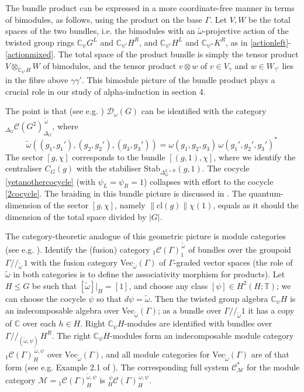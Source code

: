 \documentclass[12pt]{article}
\numberwithin{equation}{section}
\def\cC            {{\mathcal{C}}}
\def\cD            {{\mathcal{D}}}
\def\cM            {{\mathcal{M}}}
\def\bbC           {\mathbb{C}}
\def\bbT           {\mathbb{T}}
\begin{document}
The bundle product can be expressed in a more coordinate-free manner in terms of bimodules, as follows, using the product on the base $\Gamma$. Let $V,W$ be the
total spaces of the two bundles, i.e. the bimodules with an $\widetilde{\omega}$-projective action of the twisted group rings
$\bbC_{\psi}G^L$ and $\bbC_{\psi'}H^R$, and $\bbC_{\psi'}H^L$ and $\bbC_{\psi''}K^R$, as in \eqref{actionleft}-\eqref{actionmixed}. The total space
of the product bundle is simply the tensor product $V\otimes_{\bbC_{\psi'}H}W$ of bimodules, and the tensor product $v\otimes w$ of $v\in V_\gamma$ and $w\in W_{\gamma'}$ lies in the fibre above $\gamma\gamma'$. This bimodule picture of the bundle product  plays a crucial role in our study of 
alpha-induction in section 4.



The point is that (see e.g. \cite{Ost,Ev}) $\cD_\omega(G)$ can be identified with the category  ${}_{\Delta_G}\cC(G^2)_{\Delta_G}^{\,\tilde{\omega}}$, where 
\begin{equation}\widetilde{\omega}((g_1,g_1'),(g_2,g_2'),(g_3,g_3'))=\omega(g_1,g_2,g_3)\,\omega(g_1',g_2',g_3')^*\,\label{tildeomega}\end{equation}
{The sector $[g,\chi]$  corresponds to the bundle $[(g,1),\chi]$,}
where we identify the centraliser $C_G(g)$ with the stabiliser Stab$_{\Delta_G^{L\times R}}(g,1)$. The cocycle \eqref{yetanothercocycle} (with $\psi_L=\psi_R=1$) collapses with effort to the cocycle \eqref{2cocycle}. The braiding in this bundle picture is discussed in \cite{Ev}.
The quantum-dimension of the sector $[g,\chi]$, namely $\|\mathrm{cl}(g)\|\chi(1)$,  equals as it should the dimension of the total space divided by $|G|$.

 


The category-theoretic analogue of this geometric picture is module categories (see e.g. \cite{Ost1,Ost}). Identify the (fusion) category ${}_{1}\cC(\Gamma)_{1}^{\,\tilde{\omega}}$ of bundles over  the
groupoid $\Gamma/\!/\!{}_{\tilde{\omega}}\, 1$ with the fusion category Vec$_{\tilde{\omega}}(\Gamma)$ of $\Gamma$-graded vector spaces (the role of $\widetilde{\omega}$ in both categories is to define the associativity morphism for products). Let $H\le G$ be such that $[\widetilde{\omega}]|_H=[1]$, and choose any class $[\psi]\in H^2(H;\bbT)$; we can choose the cocycle $\psi$ so that $d\psi=\widetilde{\omega}$.
Then the twisted group algebra $\bbC_\psi H$ is an indecomposable algebra over Vec$_{\tilde{\omega}}(\Gamma)$; as a bundle over $\Gamma/\!/_{\tilde{\omega}}1$ it has a copy of $\bbC$ over each $h\in H$. Right $\bbC_\psi H$-modules are identified with bundles over $\Gamma/\!/\!{}_{(\tilde{\omega},\psi)}\,H^R$. The right $\bbC_\psi H$-modules form an indecomposable module
category $_1\cC(\Gamma)_H^{\,\tilde{\omega},\psi}$ over Vec$_{\tilde{\omega}}(\Gamma)$, and all module categories for Vec$_{\tilde{\omega}}(\Gamma)$ are of that form (see e.g. Example 2.1 of
\cite{Ost}). The corresponding full system $\cC_{\cM}^*$ for the module category $\cM={}_1\cC(\Gamma)_H^{\tilde{\omega},\psi}$ is $_H^{\,\psi}\cC(\Gamma)_H^{\,\tilde{\omega},\psi}$.
\end{document}
